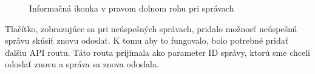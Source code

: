 \documentclass[slovak,master]{diploma}
\begin{document}
\begin{figure}[h!]
  \centering
  \newline
  \caption{Informačná ikonka v pravom dolnom rohu pri správach}
  \label{fig:messageStates}
\end{figure}

Tlačítko, zobrazujúce sa pri neúspešných správach, pridalo možnosť neúspešnú správu skúsiť znovu odoslať. K tomu aby to fungovalo, 
bolo potrebné pridať ďalšiu API routu. Táto routa prijímala ako parameter ID správy, ktorú sme chceli odoslať znovu a správa sa znova odoslala.
\end{document}
